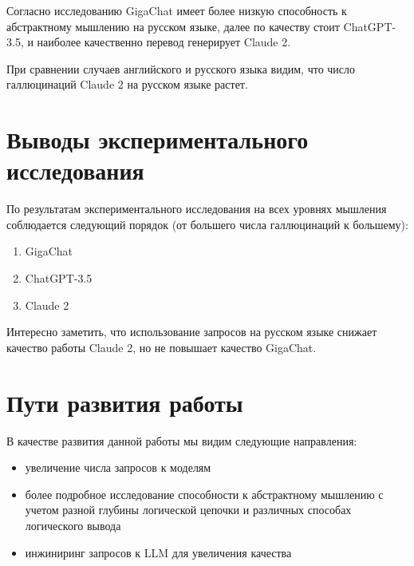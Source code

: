 \documentclass{article}
\begin{document}
Согласно исследованию GigaChat имеет более низкую способность к абстрактному мышлению на русском языке, далее по качеству стоит ChatGPT-3.5, и наиболее качественно перевод генерирует Claude 2.

При сравнении случаев английского и русского языка видим, что число галлюцинаций Claude 2 на русском языке растет.

\section{Выводы экспериментального исследования}
По результатам экспериментального исследования на всех уровнях мышления соблюдается следующий порядок (от большего числа галлюцинаций к большему):
\begin{enumerate}
    \item GigaChat
    \item ChatGPT-3.5
    \item Claude 2
\end{enumerate}

Интересно заметить, что использование запросов на русском языке снижает качество работы Claude 2, но не повышает качество GigaChat.

\section{Пути развития работы}
В качестве развития данной работы мы видим следующие направления:
\begin{itemize}
    \item увеличение числа запросов к моделям
    \item более подробное исследование способности к абстрактному мышлению с учетом разной глубины логической цепочки и различных способах логического вывода
    \item инжиниринг запросов к LLM для увеличения качества
\end{itemize}



\end{document}
